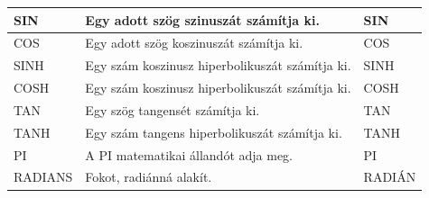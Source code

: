 \begin{table}[!h]
\begin{center}
\begin{tabular}{|m{2.5cm}|m{8cm}|m{3cm}|}
SIN & Egy adott szög szinuszát számítja ki. & SIN\\ \hline
COS & Egy adott szög koszinuszát számítja ki. & COS\\ \hline
SINH & Egy szám koszinusz hiperbolikuszát számítja ki. & SINH\\ \hline
COSH & Egy szám koszinusz hiperbolikuszát számítja ki. & COSH\\ \hline
TAN & Egy szög tangensét számítja ki. & TAN\\ \hline
TANH & Egy szám tangens  hiperbolikuszát számítja ki. & TANH\\ \hline
PI & A PI matematikai állandót adja meg. & PI\\ \hline
RADIANS & Fokot, radiánná alakít. & RADIÁN\\ \hline
\end{tabular}
\end{center}
\end{table}

